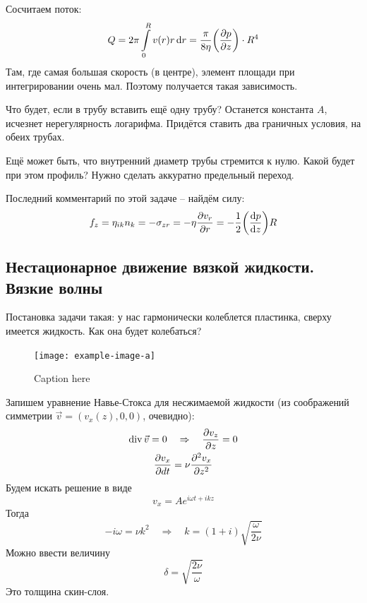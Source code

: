 Сосчитаем поток:
\begin{equation}
    Q=2\pi \int\limits_0^R v(r) r \dd{r} =
    \frac{\pi}{8\eta} \qty(\pdv{p}{z})\cdot R^4
\end{equation}
Там, где самая большая скорость (в центре), элемент площади при интегрировании очень мал. Поэтому получается такая зависимость.

Что будет, если в трубу вставить ещё одну трубу? Останется константа $A$, исчезнет нерегулярность логарифма. Придётся ставить два граничных условия, на обеих трубах.

Ещё может быть, что внутренний диаметр трубы стремится к нулю. Какой будет при этом профиль? Нужно сделать аккуратно предельный переход.

Последний комментарий по этой задаче -- найдём силу:
\begin{equation}
    f_z = \eta_{ik} n_k = -\sigma_{zr} = -\eta \pdv{v_r}{r}=
    -\frac{1}{2} \qty(\dv{p}{z})R
\end{equation}

\newpage
\subsection{Нестационарное движение вязкой жидкости. Вязкие волны}

Постановка задачи такая: у нас гармонически колеблется пластинка, сверху имеется жидкость. Как она будет колебаться?
\begin{figure}[h!]
    \centering
    \texttt{[image: example-image-a]}
    \caption{Caption here}
    \label{fig:figure1}
\end{figure}
Запишем уравнение Навье-Стокса для несжимаемой жидкости (из соображений симметрии $\vec{v}=(v_x (z),0,0)$, очевидно):
\begin{gather}
    \operatorname{div} \vec{v} = 0 \quad \Rightarrow \quad \pdv{v_z}{z} = 0\\
    \pdv{v_x}{dt} = \nu \pdv[2]{v_x}{z}
\end{gather}
Будем искать решение в виде 
\begin{equation}
    v_x = A e^{i\omega t + ikz}
\end{equation}
Тогда
\begin{equation}
    -i \omega = \nu k^2 \quad \Rightarrow \quad
    k = (1+i) \sqrt{\frac{\omega}{2\nu}}
\end{equation}
Можно ввести величину
\begin{equation}
    \delta=\sqrt{\frac{2\nu}{\omega}}
\end{equation}
Это толщина скин-слоя.

